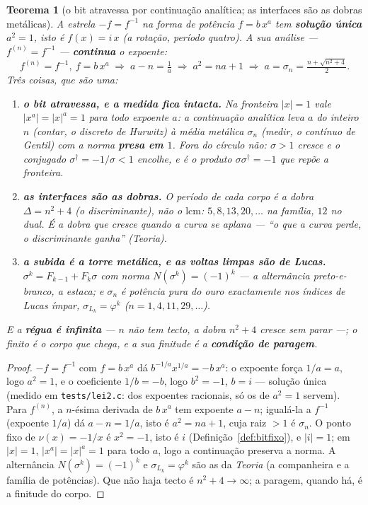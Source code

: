 \documentclass[11pt,a4paper]{article}
\newcommand{\code}[1]{\texttt{\small #1}}
\newtheorem{teorema}{Teorema}
\begin{document}
\begin{teorema}[o bit atravessa por continuação analítica; as interfaces são as dobras metálicas]\label{thm:atravessa}
A estrela $-f=f^{-1}$ na forma de potência $f=b\,x^a$ tem \textbf{solução única} $a^2=1$, isto é
$f(x)=i\,x$ (a rotação, período quatro). A sua \emph{análise} --- $f^{(n)}=f^{-1}$ --- \textbf{continua}
o expoente:
\[
  f^{(n)}=f^{-1},\ f=b\,x^a \;\Longrightarrow\; a-n=\tfrac1a \;\Longrightarrow\; a^2=na+1
  \;\Longrightarrow\; a=\sigma_n=\tfrac{n+\sqrt{n^2+4}}2 .
\]
Três coisas, que são uma:
\begin{enumerate}
\item \textbf{o bit atravessa, e a medida fica intacta.} Na fronteira $|x|=1$ vale $|x^a|=|x|^a=1$ para
  \emph{todo} expoente $a$: a continuação analítica leva $a$ do inteiro $n$ (contar, o discreto de
  Hurwitz) à média metálica $\sigma_n$ (medir, o contínuo de Gentil) com a norma \textbf{presa em $1$}.
  Fora do círculo não: $\sigma>1$ cresce e o conjugado $\sigma^\dagger=-1/\sigma<1$ encolhe, e é o
  \emph{produto} $\sigma\sigma^\dagger=-1$ que repõe a fronteira.
\item \textbf{as interfaces são as dobras.} O período de cada corpo é a dobra $\Delta=n^2+4$ (o
  discriminante), não o $\mathrm{lcm}$: $5,8,13,20,\dots$ na família, $12$ no dual. É a dobra que
  cresce quando a curva se aplana --- ``o que a curva perde, o discriminante ganha'' (\emph{Teoria}).
\item \textbf{a subida é a torre metálica, e as voltas limpas são de Lucas.} $\sigma^k=F_{k-1}+F_k\sigma$
  com norma $N(\sigma^k)=(-1)^k$ --- a alternância preto-e-branco, a estaca; e $\sigma_n$ é potência
  \emph{pura} do ouro exactamente nos índices de Lucas ímpar, $\sigma_{L_k}=\varphi^{k}$
  ($n=1,4,11,29,\dots$).
\end{enumerate}
E a \textbf{régua é infinita} --- $n$ não tem tecto, a dobra $n^2+4$ cresce sem parar ---; o
\emph{finito} é o corpo que chega, e a sua finitude é a \textbf{condição de paragem}.
\end{teorema}

\begin{proof}
$-f=f^{-1}$ com $f=b\,x^a$ dá $b^{-1/a}x^{1/a}=-b\,x^a$: o expoente força $1/a=a$, logo $a^2=1$, e o
coeficiente $1/b=-b$, logo $b^2=-1$, $b=i$ --- solução única (medido em \code{tests/lei2.c}: dos
expoentes racionais, só os de $a^2=1$ servem). Para $f^{(n)}$, a $n$-ésima derivada de $b\,x^a$ tem
expoente $a-n$; igualá-la a $f^{-1}$ (expoente $1/a$) dá $a-n=1/a$, isto é $a^2=na+1$, cuja raiz $>1$ é
$\sigma_n$. O ponto fixo de $\nu(x)=-1/x$ é $x^2=-1$, isto é $i$ (Definição~\ref{def:bitfixo}), e
$|i|=1$; em $|x|=1$, $|x^a|=|x|^a=1$ para todo $a$, logo a continuação preserva a norma. A alternância
$N(\sigma^k)=(-1)^k$ e $\sigma_{L_k}=\varphi^k$ são as da \emph{Teoria} (a companheira e a família de
potências). Que não haja tecto é $n^2+4\to\infty$; a paragem, quando há, é a finitude do corpo.
\end{proof}
\end{document}
